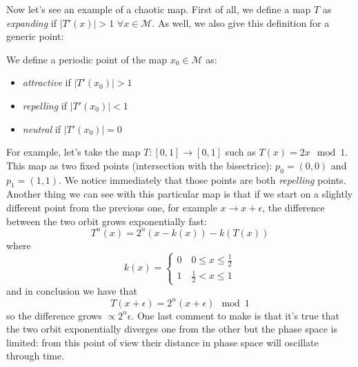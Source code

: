 Now let's see an example of a chaotic map.
First of all, we define a map $T$ as \emph{expanding} if $\left\lvert T'\left(x\right)\right\rvert > 1$ $\forall x \in \mathcal{M}$.
As well, we also give this definition for a generic point:
\begin{definition}
    We define a periodic point of the map $x_0 \in \mathcal{M}$ as:
    \begin{itemize}
        \item \emph{attractive} if $\left\lvert T'\left(x_0\right)\right\rvert > 1$
        \item \emph{repelling} if $\left\lvert T'\left(x_0\right)\right\rvert < 1$
        \item \emph{neutral} if $\left\lvert T'\left(x_0\right)\right\rvert = 0$
    \end{itemize}
\end{definition}
For example, let's take the map $T : \left[0,1\right] \to \left[0,1\right]$ such as $T\left(x\right)=2x \mod{1}$.
This map as two fixed points (intersection with the bisectrice): $p_0 = \left(0,0\right)$ and $p_1 = \left(1,1\right)$.
We notice immediately that those points are both \emph{repelling} points.
Another thing we can see with this particular map is that if we start on a slightly different point from the previous one, for example $x \to x + \epsilon$, the difference between the two orbit grows exponentially fast:
$$
    T^n\left(x\right)=2^n\left(x-k\left(x\right)\right)-k\left(T\left(x\right)\right)
$$
where
$$
    k\left(x\right)=
    \begin{cases}
        0 \quad 0\leq x \leq \frac{1}{2} \\
        1 \quad \frac{1}{2} < x \leq 1
    \end{cases}
$$
and in conclusion we have that
$$
    T\left(x + \epsilon\right)=2^n\left(x + \epsilon\right)\mod{1}
$$
so the difference grows $\propto 2^n\epsilon$.
One last comment to make is that it's true that the two orbit exponentially diverges one from the other but the phase space is limited: from this point of view their distance in phase space will oscillate through time.


